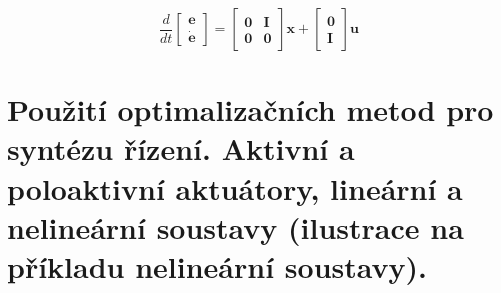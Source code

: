 \documentclass{article}
\begin{document}
	\begin{equation}
		\frac{d}{d t}
		\begin{bmatrix}
			\bm{e} \\
			\bm{\dot{e}}
		\end{bmatrix}
		=
		\begin{bmatrix}
			\bm{0} & \bm{I} \\
			\bm{0} & \bm{0}
		\end{bmatrix}
		\bm{x}
		+	
		\begin{bmatrix}
			\bm{0} \\
			\bm{I}
		\end{bmatrix}
		\bm{u}
	\end{equation}

	\section{Použití optimalizačních metod pro syntézu řízení. Aktivní a poloaktivní aktuátory, lineární a nelineární soustavy (ilustrace na příkladu nelineární soustavy).}
\end{document}
